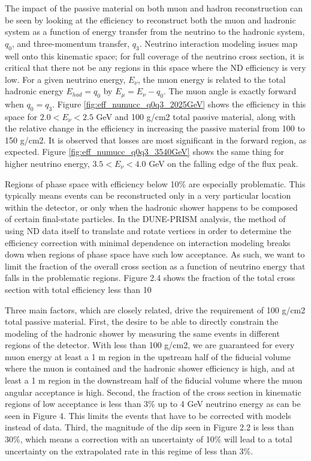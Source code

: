 The impact of the passive material on both muon and hadron reconstruction can be seen by looking at the efficiency to reconstruct both the muon and hadronic system as a function of energy transfer from the neutrino to the hadronic system, $q_0$, and three-momentum transfer, $q_3$. Neutrino interaction modeling issues map well onto this kinematic space; for full coverage of the neutrino cross section, it is critical that there not be any regions in this space where the ND efficiency is very low. For a given neutrino energy, $E_\nu$, the muon energy is related to the total hadronic energy $E_{had} = q_0$ by $E_\mu = E_\nu - q_0$. The muon angle is exactly forward when $q_0 = q_3$. Figure \ref{fig:eff_numucc_q0q3_2025GeV} shows the efficiency in this space for $2.0 < E_\nu < 2.5$ GeV and 100 g/cm2 total passive material, along with the relative change in the efficiency in increasing the passive material from 100 to 150 g/cm2. It is observed that losses are most significant in the forward region, as expected. Figure \ref{fig:eff_numucc_q0q3_3540GeV} shows the same thing for higher neutrino energy, $3.5 < E_\nu < 4.0$ GeV on the falling edge of the flux peak.


Regions of phase space with efficiency below 10\% are especially problematic. This typically means events can be reconstructed only in a very particular location within the detector, or only when the hadronic shower happens to be composed of certain final-state particles. In the DUNE-PRISM analysis, the method of using ND data itself to translate and rotate vertices in order to determine the efficiency correction with minimal dependence on interaction modeling breaks down when regions of phase space have such low acceptance. As such, we want to limit the fraction of the overall cross section as a function of neutrino energy that falls in the problematic regions. Figure 2.4 shows the fraction of the total cross section with total efficiency less than 10%

Three main factors, which are closely related, drive the requirement of 100 g/cm2 total passive material. First, the desire to be able to directly constrain the modeling of the hadronic shower by measuring the same events in different regions of the detector. With less than 100 g/cm2, we are guaranteed for every muon energy at least a 1 m region in the upstream half of the fiducial volume where the muon is contained and the hadronic shower efficiency is high, and at least a 1 m region in the downstream half of the fiducial volume where the muon angular acceptance is high. Second, the fraction of the cross section in kinematic regions of low acceptance is less than 3\% up to 4 GeV neutrino energy as can be seen in Figure 4. This limits the events that have to be corrected with models instead of data. Third, the magnitude of the dip seen in Figure 2.2 is less than 30\%, which means a correction with an uncertainty of 10\% will lead to a total uncertainty on the extrapolated rate in this regime of less than 3\%.

